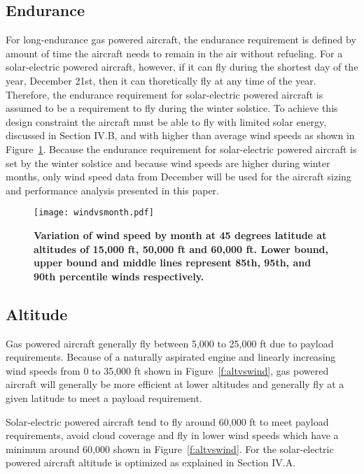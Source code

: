 \documentclass[]{aiaa-tc}%
\begin{document}
\subsection{Endurance}

For long-endurance gas powered aircraft, the endurance requirement is defined by amount of time the aircraft needs to remain in the air without refueling.  
For a solar-electric powered aircraft, however, if it can fly during the shortest day of the year, December 21st, then it can thoretically fly at any time of the year.  
Therefore, the endurance requirement for solar-electric powered aircraft is assumed to be a requirement to fly during the winter solstice.  
To achieve this design constraint the aircraft must be able to fly with limited solar energy, discussed in Section IV.B, and with higher than average wind speeds as shown in Figure~\ref{f:windvsmonth}.  
Because the endurance requirement for solar-electric powered aircraft is set by the winter solstice and because wind speeds are higher during winter months, only wind speed data from December will be used for the aircraft sizing and performance analysis presented in this paper. 

\begin{figure}[H]
	\begin{center}
	\texttt{[image: windvsmonth.pdf]}
    \caption{\textbf{Variation of wind speed by month at 45 degrees latitude at altitudes of 15,000 ft, 50,000 ft and 60,000 ft.  Lower bound, upper bound and middle lines represent 85th, 95th, and 90th percentile winds respectively.}}
	\label{f:windvsmonth}
	\end{center}
\end{figure}

\subsection{Altitude}

Gas powered aircraft generally fly between 5,000 to 25,000 ft due to payload requirements.  
Because of a naturally aspirated engine and linearly increasing wind speeds from 0 to 35,000 ft shown in Figure~\ref{f:altvswind}, gas powered aircraft will generally be more efficient at lower altitudes and generally fly at a given latitude to meet a payload requirement.  

Solar-electric powered aircraft tend to fly around 60,000 ft to meet payload requirements, avoid cloud coverage and fly in lower wind speeds which have a minimum around 60,000 shown in Figure~\ref{f:altvswind}.  For the solar-electric powered aircraft altitude is optimized as explained in Section IV.A. 
\end{document}
